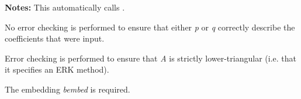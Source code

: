 \documentclass[letterpaper,10pt,english]{sphinxmanual}
\begin{document}
\begin{fulllineitems}
\begin{description}
\begin{itemize}
\end{itemize}

\end{description}

\textbf{Notes:} This automatically calls {\hyperref[c_interface/User_callable:c.ARKodeSetExplicit]{\emph{}}}.

No error checking is performed to ensure that either \emph{p} or \emph{q}
correctly describe the coefficients that were input.

Error checking is performed to ensure that \emph{A} is strictly
lower-triangular (i.e. that it specifies an ERK method).

The embedding \emph{bembed} is required.

\end{fulllineitems}

\end{document}

